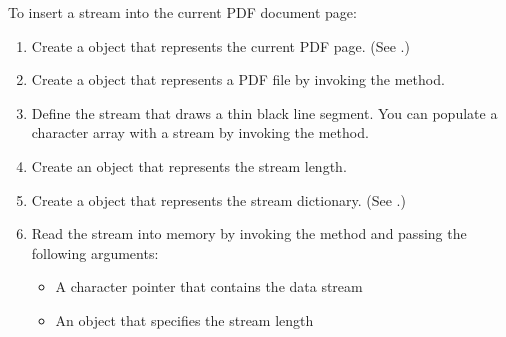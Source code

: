 \documentclass[letterpaper,12pt,english,openany,oneside]{sphinxmanual}
\begin{document}
To insert a stream into the current PDF document page:
\begin{enumerate}
%
\item {} 
Create a  object that represents the current PDF page. (See .)

\item {} 
Create a  object that represents a PDF file by invoking the  method.

\item {} 
Define the stream that draws a thin black line segment. You can populate a character array with a stream by invoking the  method.

\item {} 
Create an  object that represents the stream length.

\item {} 
Create a  object that represents the stream dictionary. (See .)

\item {} 
Read the stream into memory by invoking the  method and passing the following arguments:
\begin{itemize}
\item {} 
A character pointer that contains the data stream

\item {} 
An  object that specifies the stream length

\end{itemize}

\end{enumerate}
\end{document}
